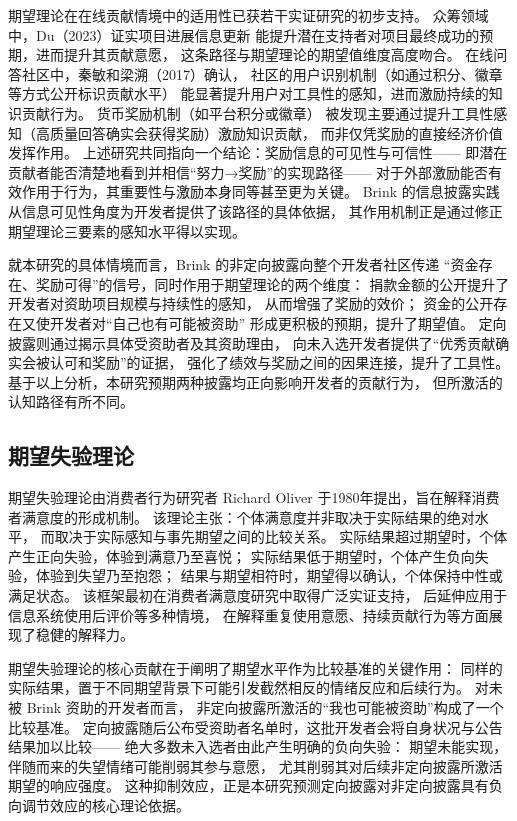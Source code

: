 \documentclass[
    type = master, %
    degree = professional,        %
    decl-page,  %
    twoside,                %
    fontset = fandol %
  ]{njuthesis}
\begin{document}
期望理论在在线贡献情境中的适用性已获若干实证研究的初步支持。
众筹领域中，Du（2023）证实项目进展信息更新
能提升潜在支持者对项目最终成功的预期，进而提升其贡献意愿，
这条路径与期望理论的期望值维度高度吻合\cite{du2023impact}。
在线问答社区中，秦敏和梁溯（2017）确认，
社区的用户识别机制（如通过积分、徽章等方式公开标识贡献水平）
能显著提升用户对工具性的感知，进而激励持续的知识贡献行为\cite{qin2017user}。
货币奖励机制（如平台积分或徽章）
被发现主要通过提升工具性感知（高质量回答确实会获得奖励）激励知识贡献，
而非仅凭奖励的直接经济价值发挥作用。
上述研究共同指向一个结论：奖励信息的可见性与可信性——
即潜在贡献者能否清楚地看到并相信“努力→奖励”的实现路径——
对于外部激励能否有效作用于行为，其重要性与激励本身同等甚至更为关键。
Brink 的信息披露实践从信息可见性角度为开发者提供了该路径的具体依据，
其作用机制正是通过修正期望理论三要素的感知水平得以实现。

就本研究的具体情境而言，Brink 的非定向披露向整个开发者社区传递
“资金存在、奖励可得”的信号，同时作用于期望理论的两个维度：
捐款金额的公开提升了开发者对资助项目规模与持续性的感知，
从而增强了奖励的效价；
资金的公开存在又使开发者对“自己也有可能被资助”
形成更积极的预期，提升了期望值。
定向披露则通过揭示具体受资助者及其资助理由，
向未入选开发者提供了“优秀贡献确实会被认可和奖励”的证据，
强化了绩效与奖励之间的因果连接，提升了工具性。
基于以上分析，本研究预期两种披露均正向影响开发者的贡献行为，
但所激活的认知路径有所不同。

\subsection{期望失验理论}

期望失验理论由消费者行为研究者
Richard Oliver 于1980年提出，旨在解释消费者满意度的形成机制\cite{oliver1980cognitive}。
该理论主张：个体满意度并非取决于实际结果的绝对水平，
而取决于实际感知与事先期望之间的比较关系。
实际结果超过期望时，个体产生正向失验，体验到满意乃至喜悦；
实际结果低于期望时，个体产生负向失验，体验到失望乃至抱怨；
结果与期望相符时，期望得以确认，个体保持中性或满足状态。
该框架最初在消费者满意度研究中取得广泛实证支持，
后延伸应用于信息系统使用后评价\cite{abrate2021relationship}等多种情境，
在解释重复使用意愿、持续贡献行为等方面展现了稳健的解释力。

期望失验理论的核心贡献在于阐明了期望水平作为比较基准的关键作用：
同样的实际结果，置于不同期望背景下可能引发截然相反的情绪反应和后续行为。
对未被 Brink 资助的开发者而言，
非定向披露所激活的“我也可能被资助”构成了一个比较基准。
定向披露随后公布受资助者名单时，这批开发者会将自身状况与公告结果加以比较——
绝大多数未入选者由此产生明确的负向失验：
期望未能实现，伴随而来的失望情绪可能削弱其参与意愿，
尤其削弱其对后续非定向披露所激活期望的响应强度。
这种抑制效应，正是本研究预测定向披露对非定向披露具有负向调节效应的核心理论依据。
\end{document}
